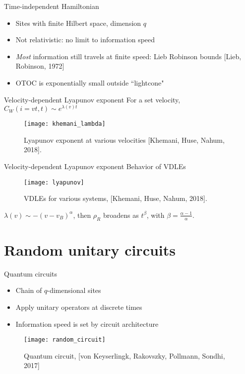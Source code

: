 \documentclass{beamer}
\begin{document}
\begin{frame}{Time-independent Hamiltonian}
\begin{itemize}
	\item Sites with finite Hilbert space, dimension $q$
	\item Not relativistic: no limit to information speed
	\item \emph{Most} information still travels at finite speed: Lieb Robinson bounds [Lieb, Robinson, 1972]
	\item OTOC is exponentially small outside ``lightcone"
\end{itemize}
\end{frame}

\begin{frame}{Velocity-dependent Lyapunov exponent}
For a set velocity, $C_W(i = vt, t) \sim e^{\lambda(v)t}$
\begin{figure}
	\centering
	\texttt{[image: khemani\_lambda]}
	\caption{Lyapunov exponent at various velocities [Khemani, Huse, Nahum, 2018].}
\end{figure}
\end{frame}

\begin{frame}{Velocity-dependent Lyapunov exponent}
Behavior of VDLEs
\begin{figure}
	\centering
	\texttt{[image: lyapunov]}
	\caption{VDLEs for various systems, [Khemani, Huse, Nahum, 2018].}
\end{figure}
$\lambda(v)\sim -(v-v_B)^\alpha$, then $\rho_R$ broadens as $t^\beta$, with  $\beta=\frac{\alpha-1}{\alpha}$.
\end{frame}

\section{Random unitary circuits}

\begin{frame}{Quantum circuits}
\begin{itemize}
	\item Chain of $q$-dimensional sites
	\item Apply unitary operators at discrete times
	\item Information speed is set by circuit architecture
\end{itemize}
\begin{figure}
	\centering
	\texttt{[image: random\_circuit]}
	\caption{Quantum circuit, [von Keyserlingk, Rakovszky, Pollmann, Sondhi, 2017]}
\end{figure}
\end{frame}
\end{document}
